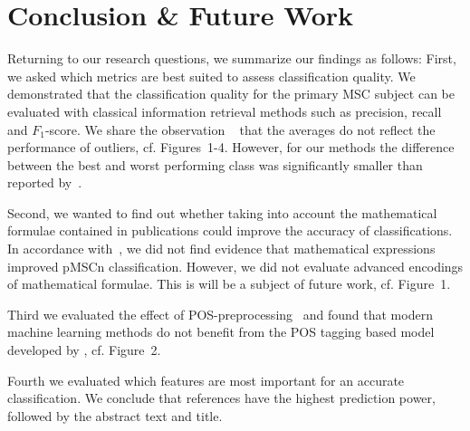 \section{Conclusion \& Future Work}\label{sec.concl}
Returning to our research questions, we summarize our findings as follows:
First, we asked which metrics are best suited to assess classification quality.
We demonstrated that the classification quality for the primary MSC subject can be evaluated with classical information retrieval methods such as precision, recall and \(F_{1}\)-score.
We share the observation \citeauthor{BarthelTB13}~\cite{BarthelTB13} that the averages do not reflect the performance of outliers, cf. Figures~1-4.
However, for our methods the difference between the best and worst performing class was significantly smaller than reported by~\cite{BarthelTB13}.

Second, we wanted to find out whether taking into account the mathematical formulae contained in publications could improve the accuracy of classifications.
In accordance with~\cite{Scharpf2020}, we did not find evidence that mathematical expressions improved pMSCn classification.
However, we did not evaluate advanced encodings of mathematical formulae. This is will be a subject of future work, cf. Figure~1.


Third we evaluated the effect of POS-preprocessing~\cite{SchonebergS14} and found that modern machine learning methods do not benefit from the POS tagging based model developed by \cite{SchonebergS14}, cf. Figure~2.


Fourth we evaluated which features are most important for an accurate classification.
We conclude that references have the highest prediction power, followed by the abstract text and title.



